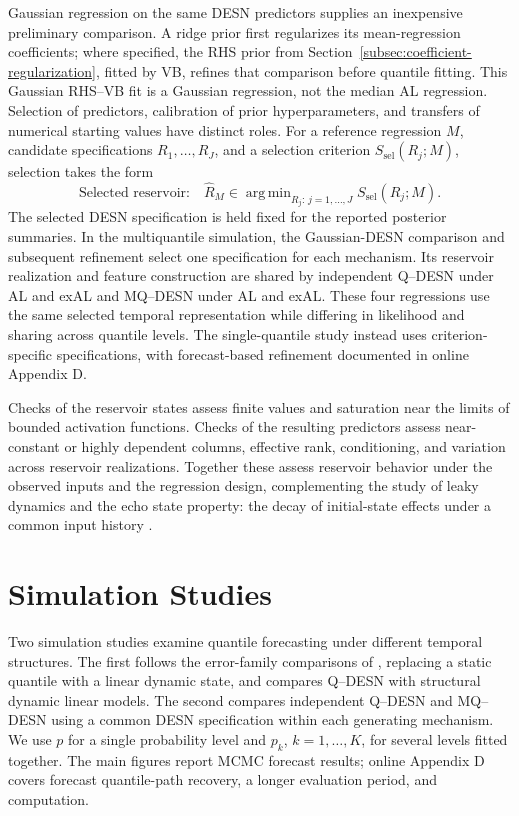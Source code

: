 \documentclass[12pt,letterpaper]{article}
\numberwithin{equation}{section}
\DeclareMathOperator{\argmin}{arg\,min}
\begin{document}
Gaussian regression on the same DESN predictors supplies an inexpensive
preliminary comparison. A ridge prior first regularizes its mean-regression
coefficients; where specified, the RHS prior from
Section~\ref{subsec:coefficient-regularization}, fitted by VB, refines that
comparison before quantile fitting. This Gaussian RHS--VB fit is a Gaussian
regression, not the median AL regression. Selection of predictors, calibration
of prior hyperparameters, and transfers of numerical starting values have
distinct roles. For a
reference regression \(M\), candidate specifications \(R_1,\ldots,R_J\),
and a selection criterion \(S_{\mathrm{sel}}(R_j;M)\), selection takes
the form
\begin{equation}
\text{Selected reservoir:}\quad \widehat R_M
\in\argmin_{R_j:\,j=1,\ldots,J}
S_{\mathrm{sel}}(R_j;M).
\label{eq:reservoir-selection-main}
\end{equation}
The selected DESN specification is held fixed for the reported posterior
summaries. In the
multiquantile simulation, the Gaussian-DESN comparison and subsequent refinement select
one specification for each mechanism. Its reservoir realization and feature
construction are shared by independent Q--DESN under AL and exAL and
MQ--DESN under AL and exAL. These four regressions
use the same selected temporal representation while differing in likelihood
and sharing across quantile levels. The single-quantile study instead uses
criterion-specific specifications, with forecast-based refinement
documented in online Appendix D.

Checks of the reservoir states assess finite values and saturation near the
limits of bounded activation functions. Checks of the resulting
predictors assess near-constant or highly dependent columns, effective rank,
conditioning, and variation across reservoir realizations. Together these
assess reservoir behavior under the observed inputs and the regression design, complementing the
study of leaky dynamics and the echo state property: the decay of initial-state
effects under a common input history
\citep{JaegerLukoseviciusPopoviciSiewert2007LeakyESN,
YildizJaegerKiebel2012ESP}.


\section{Simulation Studies}
\label{sec:simulation}

\noindent
Two simulation studies examine quantile forecasting under different temporal
structures. The first follows the error-family comparisons of
\citet{yan2025new}, replacing a static quantile with a linear dynamic state,
and compares Q--DESN with structural dynamic linear models. The second
compares independent Q--DESN and MQ--DESN using a common DESN specification
within each generating mechanism. We use \(p\) for a single probability
level and \(p_k\), \(k=1,\ldots,K\), for several levels fitted together.
The main figures report MCMC forecast results; online Appendix D covers
forecast quantile-path recovery, a longer evaluation period, and computation.
\end{document}
